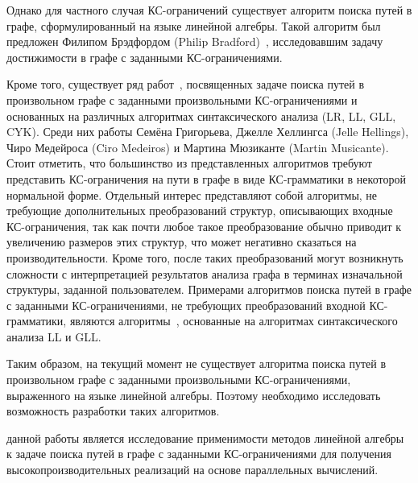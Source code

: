 Однако для частного случая КС-ограничений существует алгоритм поиска путей в графе, сформулированный на языке линейной алгебры. Такой алгоритм был предложен Филипом Брэдфордом (Philip Bradford)~\cite{bradford2017efficient}, исследовавшим задачу достижимости в графе с заданными КС-ограничениями. 

Кроме того, существует ряд работ~\cite{hellings2014conjunctive,medeiros2018efficient,santos2018bottom,grigorev2017context}, посвященных задаче поиска путей в произвольном графе с заданными произвольными КС-ограничениями и основанных на различных алгоритмах синтаксического анализа (LR, LL, GLL, CYK). Среди них работы Семёна Григорьева, Джелле Хеллингса (Jelle Hellings), Чиро Медейроса (Ciro Medeiros) и Мартина Мюзиканте (Martin Musicante). Стоит отметить, что большинство из представленных алгоритмов требуют представить КС-ограничения на пути в графе в виде КС-грамматики в некоторой нормальной форме. Отдельный интерес представляют собой алгоритмы, не требующие дополнительных преобразований структур, описывающих входные КС-ограничения, так как почти любое такое преобразование обычно приводит к увеличению размеров этих структур, что может негативно сказаться на производительности. Кроме того, после таких преобразований могут возникнуть сложности с интерпретацией результатов анализа графа в терминах изначальной структуры, заданной пользователем. Примерами алгоритмов поиска путей в графе с заданными КС-ограничениями, не требующих преобразований входной КС-грамматики, являются алгоритмы~\cite{medeiros2018efficient,grigorev2017context}, основанные на алгоритмах синтаксического анализа LL и GLL.

Таким образом, на текущий момент не существует алгоритма поиска путей в произвольном графе с заданными произвольными КС-ограничениями, выраженного на языке линейной алгебры. Поэтому необходимо исследовать возможность разработки таких алгоритмов.

{\aim} данной работы является исследование применимости методов линейной алгебры к задаче поиска путей в графе с заданными КС-ограничениями для получения высокопроизводительных реализаций на основе параллельных вычислений.

